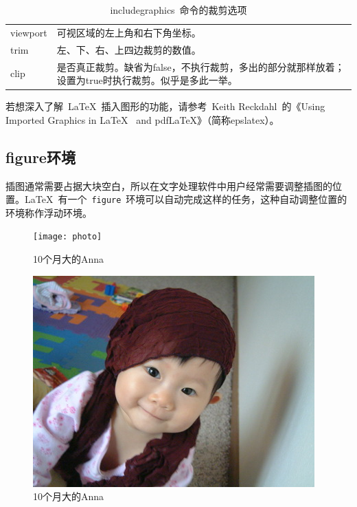 \begin{table}[htbp]
\caption{includegraphics~命令的裁剪选项}
\label{tab:clip}
\centering
\begin{tabularx}{350pt}{lX}
    \toprule
    viewport & 可视区域的左上角和右下角坐标。\\
    trim & 左、下、右、上四边裁剪的数值。\\
    clip & 是否真正裁剪。缺省为false，不执行裁剪，多出的部分就那样放着；设置为true时执行裁剪。似乎是多此一举。\\
    \bottomrule
\end{tabularx}
\end{table}

若想深入了解~\LaTeX~插入图形的功能，请参考~Keith Reckdahl~的《Using Imported Graphics in \LaTeX~ and pdf\LaTeX》\citep{Reckdahl_2006}（简称epslatex）。

\subsection{figure环境}
插图通常需要占据大块空白，所以在文字处理软件中用户经常需要调整插图的位置。\LaTeX~有一个~\verb|figure|~环境可以自动完成这样的任务，这种自动调整位置的环境称作浮动环境。

\begin{code}
\begin{figure}[htbp]%
\centering
\texttt{[image: photo]}
\caption{10个月大的Anna}
\label{fig:anna}
\end{figure}
\end{code}

\begin{figure}[htbp]
\centering
\includegraphics[bb=0 0 410 307,scale=.8]{dscf4684}
\caption{10个月大的Anna}
\label{fig:anna}
\end{figure}

